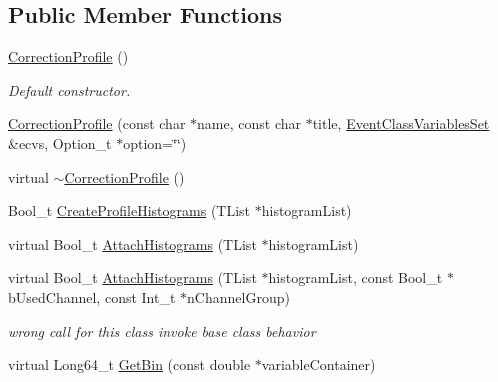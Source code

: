 \subsection*{Public Member Functions}
\begin{DoxyCompactItemize}
\item 
\mbox{\label{classQn_1_1CorrectionProfile_af90a6f73d757a582036d0fed7133b811}} 
\mbox{\hyperlink{classQn_1_1CorrectionProfile_af90a6f73d757a582036d0fed7133b811}{Correction\+Profile}} ()
\begin{DoxyCompactList}\small\item\em Default constructor. \end{DoxyCompactList}\item 
\mbox{\hyperlink{classQn_1_1CorrectionProfile_a509dc83514bf4e9a0aedcd37d98de4ed}{Correction\+Profile}} (const char $\ast$name, const char $\ast$title, \mbox{\hyperlink{classQn_1_1EventClassVariablesSet}{Event\+Class\+Variables\+Set}} \&ecvs, Option\+\_\+t $\ast$option=\char`\"{}\char`\"{})
\item 
virtual \mbox{\hyperlink{classQn_1_1CorrectionProfile_a571f318db482c796b420baedc637e185}{$\sim$\+Correction\+Profile}} ()
\item 
Bool\+\_\+t \mbox{\hyperlink{classQn_1_1CorrectionProfile_acdc3507cbdb49bef3fe821302635ca40}{Create\+Profile\+Histograms}} (T\+List $\ast$histogram\+List)
\item 
virtual Bool\+\_\+t \mbox{\hyperlink{classQn_1_1CorrectionProfile_a679319b8518152cf5563a87d77d87f2e}{Attach\+Histograms}} (T\+List $\ast$histogram\+List)
\item 
\mbox{\label{classQn_1_1CorrectionProfile_a29060032cbf84f4f2891db40f466bf21}} 
virtual Bool\+\_\+t \mbox{\hyperlink{classQn_1_1CorrectionProfile_a29060032cbf84f4f2891db40f466bf21}{Attach\+Histograms}} (T\+List $\ast$histogram\+List, const Bool\+\_\+t $\ast$b\+Used\+Channel, const Int\+\_\+t $\ast$n\+Channel\+Group)
\begin{DoxyCompactList}\small\item\em wrong call for this class invoke base class behavior \end{DoxyCompactList}\item 
virtual Long64\+\_\+t \mbox{\hyperlink{classQn_1_1CorrectionProfile_a23eab8b418467aa8dc9ff6d590acd5c0}{Get\+Bin}} (const double $\ast$variable\+Container)
\item 

\end{DoxyCompactItemize}
